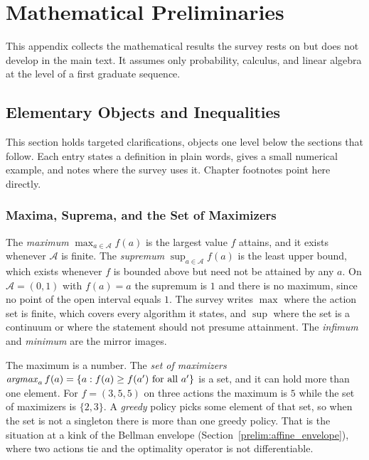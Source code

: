 \section{Mathematical Preliminaries}
\label{appendix:mathprelim}

This appendix collects the mathematical results the survey rests on but does not develop in the main text. It assumes only probability, calculus, and linear algebra at the level of a first graduate sequence.

\subsection{Elementary Objects and Inequalities}
\label{prelim:elementary}

This section holds targeted clarifications, objects one level below the sections that follow. Each entry states a definition in plain words, gives a small numerical example, and notes where the survey uses it. Chapter footnotes point here directly.

\subsubsection{Maxima, Suprema, and the Set of Maximizers}
\label{prelim:argopt}

The \emph{maximum} $\max_{a \in \mathcal{A}} f(a)$ is the largest value $f$ attains, and it exists whenever $\mathcal{A}$ is finite. The \emph{supremum} $\sup_{a \in \mathcal{A}} f(a)$ is the least upper bound, which exists whenever $f$ is bounded above but need not be attained by any $a$. On $\mathcal{A} = (0,1)$ with $f(a) = a$ the supremum is $1$ and there is no maximum, since no point of the open interval equals $1$. The survey writes $\max$ where the action set is finite, which covers every algorithm it states, and $\sup$ where the set is a continuum or where the statement should not presume attainment. The \emph{infimum} and \emph{minimum} are the mirror images.

The maximum is a number. The \emph{set of maximizers} $\mathop{\it argmax}_{a} f(a) = \{a : f(a) \geq f(a') \text{ for all } a'\}$ is a set, and it can hold more than one element. For $f = (3, 5, 5)$ on three actions the maximum is $5$ while the set of maximizers is $\{2, 3\}$. A \emph{greedy} policy picks some element of that set, so when the set is not a singleton there is more than one greedy policy. That is the situation at a kink of the Bellman envelope (Section~\ref{prelim:affine_envelope}), where two actions tie and the optimality operator is not differentiable.

